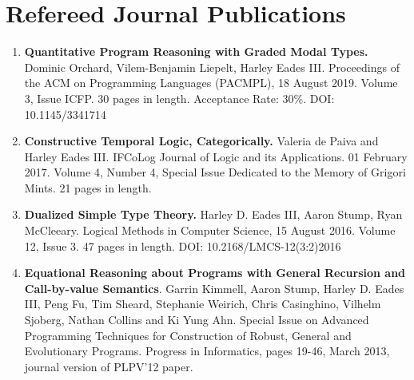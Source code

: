 \documentclass[11pt]{article}
\begin{document}
  \section{Refereed Journal Publications}
  \begin{enumerate}
  \item[] \textbf{Quantitative Program Reasoning with Graded Modal
    Types.}  Dominic Orchard, Vilem-Benjamin Liepelt, Harley Eades
    III.  Proceedings of the ACM on Programming Languages (PACMPL), 18
    August 2019. Volume 3, Issue ICFP. 30 pages in length. Acceptance
    Rate: 30\%. DOI: 10.1145/3341714

  \item[] \textbf{Constructive Temporal Logic, Categorically.} Valeria
    de Paiva and Harley Eades III.  IFCoLog Journal of Logic and its
    Applications. 01 February 2017. Volume 4, Number 4, Special Issue
    Dedicated to the Memory of Grigori Mints.  21 pages in length.

  \item[] \textbf{Dualized Simple Type Theory.} Harley D. Eades III, Aaron
    Stump, Ryan McCleeary. Logical Methods in Computer Science, 15
    August 2016. Volume 12, Issue 3. 47 pages in length.
    DOI: 10.2168/LMCS-12(3:2)2016    

  \item[] \textbf{Equational Reasoning about Programs with General
    Recursion and Call-by-value Semantics}.  Garrin Kimmell, Aaron
    Stump, Harley D. Eades III, Peng Fu, Tim Sheard, Stephanie Weirich,
    Chris Casinghino, Vilhelm Sjoberg, Nathan Collins and Ki Yung Ahn.
    Special Issue on Advanced Programming Techniques for Construction of
    Robust, General and Evolutionary Programs. Progress in Informatics,
    pages 19-46, March 2013, journal version of PLPV’12 paper.

  \end{enumerate}
\end{document}
